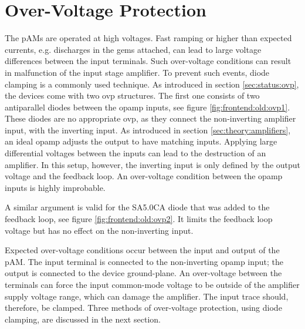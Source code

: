 \section{Over-Voltage Protection}
\label{sec:solving:ovp}
The \acp{pAM} are operated at high voltages. Fast ramping or higher than expected currents, e.g. discharges in the \acp{gem} attached, can lead to large voltage differences between the input terminals. Such over-voltage conditions can result in malfunction of the input stage amplifier. To prevent such events, diode clamping is a commonly used technique. As introduced in section \ref{sec:status:ovp}, the devices come with two \ac{ovp} structures. 
The first one consists of two antiparallel diodes between the \ac{opamp} inputs, see figure \ref{fig:frontend:old:ovp1}. These diodes are no appropriate \ac{ovp}, as they connect the non-inverting amplifier input, with the inverting input. As introduced in section \ref{sec:theory:amplifiers}, an ideal \ac{opamp} adjusts the output to have matching inputs. Applying large differential voltages between the inputs can lead to the destruction of an amplifier. In this setup, however, the inverting input is only defined by the output voltage and the feedback loop. An over-voltage condition between the \ac{opamp} inputs is highly improbable. 

A similar argument is valid for the SA5.0CA diode that was added to the feedback loop, see figure \ref{fig:frontend:old:ovp2}. It limits the feedback loop voltage but has no effect on the non-inverting input.

Expected over-voltage conditions occur between the input and output of the \ac{pAM}. The input terminal is connected to the non-inverting \ac{opamp} input; the output is connected to the device ground-plane. An over-voltage between the terminals can force the input common-mode voltage to be outside of the amplifier supply voltage range, which can damage the amplifier. The input trace should, therefore, be clamped. Three methods of over-voltage protection, using diode clamping, are discussed in the next section.


